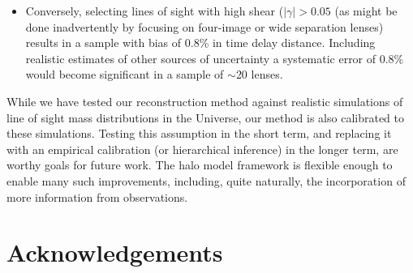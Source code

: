 \documentclass[useAMS,usenatbib]{mn2e}
\begin{document}
\begin{itemize}
\item Conversely, selecting lines of sight with high shear ($|\gamma| >
0.05$ (as might be done inadvertently by focusing on four-image or wide
separation lenses) results in a sample with bias of 0.8\% in time delay
distance. Including realistic estimates of other sources of uncertainty a systematic error
of 0.8\% would become significant in a sample of $\sim$20 lenses. 


\end{itemize}





While we have tested our reconstruction method against realistic simulations
of line of sight mass distributions in the Universe, our method is also 
calibrated to these simulations. Testing this assumption in the short term,
and replacing it with an empirical calibration (or hierarchical inference) in
the longer term, are worthy goals for future work. The halo model framework is
flexible enough to enable many such improvements, including, quite naturally,
the incorporation of more information from observations. 



\section*{Acknowledgements}
 
\end{document}
